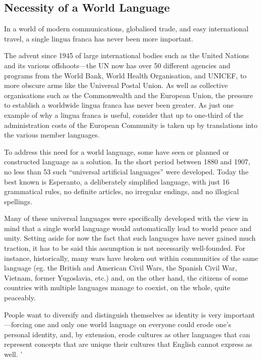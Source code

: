 \documentclass[../main.tex]{subfiles}
\begin{document}
    \subsection{Necessity of a World Language}
        In a world of modern communications, globalised trade, and easy international travel, a single lingua franca has never been more important. \par 
        The advent since 1945 of large international bodies such as the United Nations and its various offshoots---the UN now has over 50 different agencies and programs from the World Bank, World Health Organisation, and UNICEF, to more obscure arms like the Universal Postal Union. As well as collective organisations such as the Commonwealth and the European Union, the pressure to establish a worldwide lingua franca has never been greater. As just one example of why a lingua franca is useful, consider that up to one-third of the administration costs of the European Community is taken up by translations into the various member languages. \par 
        To address this need for a world language, some have seen or planned or constructed language as a solution. In the short period between 1880 and 1907, no less than 53 such ``universal artificial languages'' were developed. Today the best known is Esperanto, a deliberately simplified language, with just 16 grammatical rules, no definite articles, no irregular endings, and no illogical spellings. \par
        Many of these universal languages were specifically developed with the view in mind that a single world language would automatically lead to world peace and unity. Setting aside for now the fact that such languages have never gained much traction, it has to be said this assumption is not necessarily well-founded. For instance, historically, many wars have broken out within communities of the same language (eg. the British and American Civil Wars, the Spanish Civil War, Vietnam, former Yugoslavia, etc.) and, on the other hand, the citizens of some countries with multiple languages manage to coexist, on the whole, quite peaceably. \par 
        People want to diversify and distinguish themselves as identity is very important---forcing one and only one world language on everyone could erode one's personal identity, and, by extension, erode cultures as other languages that can represent concepts that are unique their cultures that English cannot express as well. '
\end{document}
